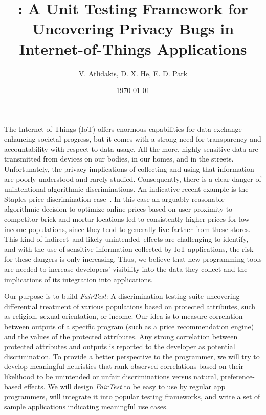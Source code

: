 \documentclass{article}
\title{\thetool: A Unit Testing Framework for Uncovering Privacy Bugs in
  Internet-of-Things Applications}
\author{V. Atlidakis, D. X. He, E. D. Park}
\date{\today}
\newcommand{\thetool}{{\it FairTest}\xspace}
\newcommand{\heading}[1]{\noindent{\bf{#1}}}
\begin{document}
\maketitle

\heading{Motivation.}
The Internet of Things (IoT) offers enormous capabilities for data exchange
enhancing societal progress, but it comes with a strong need for transparency
and accountability with respect to data usage. All the more, highly sensitive
data are transmitted from devices on our bodies, in our homes, and in the
streets. Unfortunately, the privacy implications of collecting and using that
information are poorly understood and rarely studied. Consequently, there is a
clear danger of unintentional algorithmic discriminations. An indicative recent
example is the Staples price discrimination case~\cite{Staples}.
In this case an arguably reasonable algorithmic decision to optimize online
prices based on user proximity to competitor brick-and-mortar locations led to
consistently higher prices for low-income populations, since they tend to
generally live farther from these stores. This kind of indirect--and likely
unintended--effects are challenging to identify, and with the use of sensitive
information collected by IoT applications, the risk for these dangers is only
increasing. Thus, we believe that new programming tools are needed to increase
developers’ visibility into the data they collect and the implications of its
integration into applications.

\heading{Goals.}
Our purpose is to build \thetool: A discrimination testing suite uncovering
differential treatment of various populations based on protected
attributes, such as religion, sexual orientation, or income. Our idea is to
measure correlation between outputs of a specific program (such as a price
recommendation engine) and the values of the protected attributes. Any strong
correlation between protected attributes and outputs is reported to the
developer as potential discrimination. To provide a better perspective to the
programmer, we will try to develop meaningful heuristics that rank observed
correlations based on their likelihood to be unintended or unfair
discriminations versus natural, preference-based effects. We will design
{\it FairTest} to be easy to use by regular app programmers, will integrate it
into popular testing frameworks, and write a set of sample applications
indicating meaningful use cases.
\end{document}
